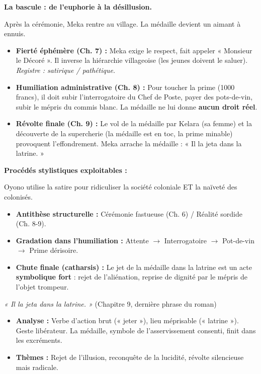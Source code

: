 \documentclass[11pt]{article}
\newcommand{\cle}[1]{{\popxbold\color{popdark}#1}}
\begin{document}
\textbf{La bascule : de l'euphorie à la désillusion.}\par
Après la cérémonie, Meka rentre au village. La médaille devient un aimant à ennuis.
\begin{itemize}
    \item \textbf{Fierté éphémère (Ch. 7) :} Meka exige le respect, fait appeler « Monsieur le Décoré ». Il inverse la hiérarchie villageoise (les jeunes doivent le saluer). \emph{Registre : satirique / pathétique.}
    \item \textbf{Humiliation administrative (Ch. 8) :} Pour toucher la prime (1000 francs), il doit subir l'interrogatoire du Chef de Poste, payer des pots-de-vin, subir le mépris du commis blanc. La médaille ne lui donne \textbf{aucun droit réel}.
    \item \textbf{Révolte finale (Ch. 9) :} Le vol de la médaille par Kelara (sa femme) et la découverte de la supercherie (la médaille est en toc, la prime minable) provoquent l'effondrement. Meka arrache la médaille : « Il la jeta dans la latrine. »
\end{itemize}

\textbf{Procédés stylistiques exploitables :}\par
\begin{propriete}
Oyono utilise la \cle{satire} pour ridiculiser la société coloniale ET la naïveté des colonisés.
\begin{itemize}
    \item \textbf{Antithèse structurelle :} Cérémonie fastueuse (Ch. 6) / Réalité sordide (Ch. 8-9).
    \item \textbf{Gradation dans l'humiliation :} Attente $\rightarrow$ Interrogatoire $\rightarrow$ Pot-de-vin $\rightarrow$ Prime dérisoire.
    \item \textbf{Chute finale (catharsis) :} Le jet de la médaille dans la latrine est un acte \textbf{symbolique fort} : rejet de l'aliénation, reprise de dignité par le mépris de l'objet trompeur.
\end{itemize}
\end{propriete}

\begin{exemplebox}
\textit{« Il la jeta dans la latrine. »} (Chapitre 9, dernière phrase du roman)
\begin{itemize}
    \item \textbf{Analyse :} Verbe d'action brut (« jeter »), lieu méprisable (« latrine »). Geste libérateur. La médaille, symbole de l'asservissement consenti, finit dans les excréments.
    \item \textbf{Thèmes :} Rejet de l'illusion, reconquête de la lucidité, révolte silencieuse mais radicale.
\end{itemize}
\end{exemplebox}
\end{document}
